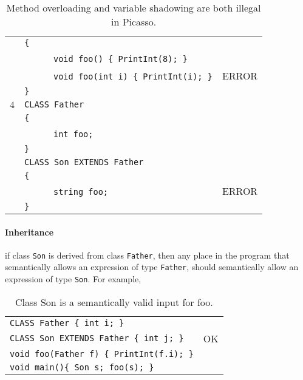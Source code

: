 \documentclass{article}
\begin{document}
\begin{table}[h]
\begin{tabular}{|l|l|l|}
     & \verb"{"                                       &       \\
     & ~ ~ ~ ~\verb"void foo() { PrintInt(8); }"      &       \\
     & ~ ~ ~ ~\verb"void foo(int i) { PrintInt(i); }" & ERROR \\
     & \verb"}"                                       &       \\
\hline
 $4$ & \verb"CLASS Father"             &       \\
     & \verb"{"                        &       \\
     & ~ ~ ~ ~\verb"int foo;"          &       \\
     & \verb"}"                        &       \\
     & \verb"CLASS Son EXTENDS Father" &       \\
     & \verb"{"                        &       \\
     & ~ ~ ~ ~\verb"string foo;"       & ERROR \\
     & \verb"}"                        &       \\
\hline
\end{tabular}
\caption{Method overloading and variable shadowing are both illegal in Picasso.
\label{Table_Code_Examples_Overload_Override}}
\end{table}
\newpage
\paragraph{Inheritance} if class \verb"Son" is derived from class \verb"Father",
then any place in the program that semantically allows an expression of type \verb"Father",
should semantically allow an expression of type \verb"Son".
For example,
\begin{table}[h]
\centering
\begin{tabular}{ | l  | l | }
\hline
\verb"CLASS Father { int i; }"               &    \\
\verb"CLASS Son EXTENDS Father { int j; }"   & OK \\
\verb"void foo(Father f) { PrintInt(f.i); }" &    \\
\verb"void main(){ Son s; foo(s); }"         &    \\
\hline
\end{tabular}
\caption{Class Son is a semantically valid input for foo.
\label{Table_Code_Examples_Son_Class_Instead_Of_Father_Class}}
\end{table}
\end{document}
